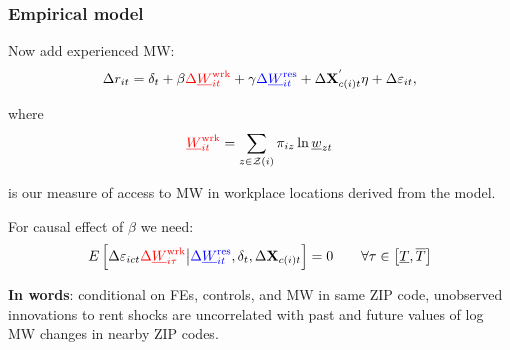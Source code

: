 \documentclass[aspectratio=169, t]{beamer}
\newcommand{\Z}{\mathcal{Z}}
\newcommand{\MW}{\underline{W}}
\begin{document}
\begin{frame}
    \frametitle{Empirical model}
        
    Now add experienced MW:
    $$
    \Delta r_{it} = \delta_t +
        \beta {\color{red}\Delta \MW^{\text{wrk}}_{it}} +
        \gamma {\color{blue} \Delta \MW^{\text{res}}_{it}} + 
        \Delta \mathbf{X}^{'}_{c(i)t} \eta + 
        \Delta \varepsilon_{it} ,
    $$
    
    where 
    \[
    {\color{red} \MW^{\text{wrk}}_{it}} = 
        \sum_{z \in \Z(i)} \pi_{i z} \ln \underline{w}_{zt}
    \] 
    
    is our measure of access to MW in workplace locations derived from the model.


    \pause
    \vspace{2mm}
    For causal effect of $\beta$ we need:
    $$
    E \left[\Delta \varepsilon_{ict} {\color{red} \Delta 
    \MW^{\text{wrk}}_{i\tau}} 
    \big| {\color{blue}\Delta \MW^{\text{res}}_{it}}, \delta_t, \Delta 
    \mathbf{X}_{c(i)t} \right] = 0
    \quad \quad \forall \tau \in \left[ \underline{T}, \overline{T} \right]
    $$
    
    \pause
    \vspace{2mm}
    \textbf{In words}: conditional on FEs, controls, and {\color{blue} MW in same ZIP 
    code}, unobserved innovations to rent shocks are uncorrelated with past and future 
    values of log MW changes {\color{red} in nearby ZIP codes}.
\end{frame}
\end{document}
